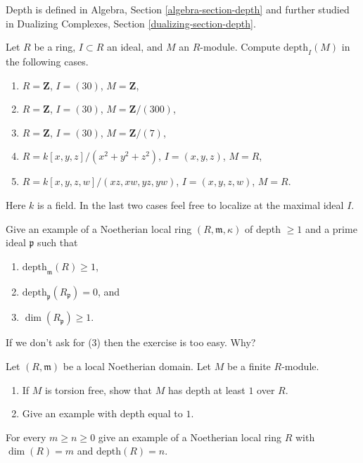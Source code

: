 \noindent
Depth is defined in Algebra, Section \ref{algebra-section-depth}
and further studied in
Dualizing Complexes, Section \ref{dualizing-section-depth}.

\begin{exercise}
\label{exercise-compute-depth}
Let $R$ be a ring, $I \subset R$ an ideal, and $M$ an $R$-module.
Compute $\text{depth}_I(M)$ in the following cases.
\begin{enumerate}
\item $R = \mathbf{Z}$, $I = (30)$, $M = \mathbf{Z}$,
\item $R = \mathbf{Z}$, $I = (30)$, $M = \mathbf{Z}/(300)$,
\item $R = \mathbf{Z}$, $I = (30)$, $M = \mathbf{Z}/(7)$,
\item $R = k[x, y, z]/(x^2 + y^2 + z^2)$, $I = (x, y, z)$, $M = R$,
\item $R = k[x, y, z, w]/(xz, xw, yz, yw)$, $I = (x, y, z, w)$,
$M = R$.
\end{enumerate}
Here $k$ is a field. In the last two cases feel free to localize
at the maximal ideal $I$.
\end{exercise}

\begin{exercise}
\label{exercise-depth-not-inherited-localization}
Give an example of a Noetherian local ring $(R, \mathfrak m, \kappa)$
of depth $\geq 1$ and a prime ideal $\mathfrak p$ such that
\begin{enumerate}
\item $\text{depth}_\mathfrak m(R) \geq 1$,
\item $\text{depth}_\mathfrak p(R_\mathfrak p) = 0$, and
\item $\dim(R_\mathfrak p) \geq 1$.
\end{enumerate}
If we don't ask for (3) then the exercise is too easy. Why?
\end{exercise}

\begin{exercise}
\label{exercise-depth-torsion-free}
Let $(R, \mathfrak m)$ be a local Noetherian domain.
Let $M$ be a finite $R$-module.
\begin{enumerate}
\item If $M$ is torsion free, show that $M$ has depth at least $1$ over $R$.
\item Give an example with depth equal to $1$.
\end{enumerate}
\end{exercise}

\begin{exercise}
\label{exercise-depth-examples}
For every $m \geq n \geq 0$ give an example of a Noetherian local
ring $R$ with $\dim(R) = m$ and $\text{depth}(R) = n$.
\end{exercise}


